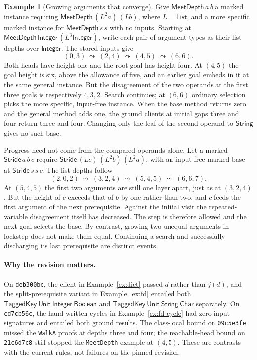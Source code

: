 \documentclass[11pt]{article}
\theoremstyle{definition}
\newtheorem{example}[theorem]{Example}
\newcommand{\code}[1]{\texttt{#1}}
\newcommand{\Bool}{\mathsf{Boolean}}
\newcommand{\Int}{\mathsf{Integer}}
\newcommand{\Str}{\mathsf{String}}
\newcommand{\Unit}{\mathsf{Unit}}
\newcommand{\List}{\mathsf{List}}
\begin{document}
\begin{example}[Growing arguments that converge]\label{ex:fd-height}
Give $\mathsf{MeetDepth}\,a\,b$ a marked instance requiring
$\mathsf{MeetDepth}\,(L^2a)\,(L b)$, where $L=\List$, and a more specific
marked instance for $\mathsf{MeetDepth}\,s\,s$ with no inputs. Starting
at $\mathsf{MeetDepth}\,\Int\,(L^3\Int)$, write each pair of argument
types as their list depths over $\Int$. The stored inputs give
\[
 (0,3)\;\leadsto\;(2,4)\;\leadsto\;(4,5)\;\leadsto\;(6,6).
\]
Both heads have height one and the root goal has height four. At $(4,5)$
the goal height is six, above the allowance of five, and an earlier goal
embeds in it at the same general instance. But the disagreement of the two operands
at the first three goals is respectively $4,3,2$. Search continues; at
$(6,6)$ ordinary selection picks the more specific, input-free instance.
When the base method returns zero and the general method adds one, the
ground clients at initial gaps three and four return three and four.
Changing only the leaf of the second operand to $\Str$ gives no such base.

Progress need not come from the compared operands alone. Let a marked
$\mathsf{Stride}\,a\,b\,c$ require $\mathsf{Stride}\,(Lc)\,(L^2b)\,(L^2a)$,
with an input-free marked base at $\mathsf{Stride}\,s\,s\,c$. The list depths follow
\[
 (2,0,2)\;\leadsto\;(3,2,4)\;\leadsto\;(5,4,5)\;\leadsto\;(6,6,7).
\]
At $(5,4,5)$ the first two arguments are still one layer apart, just as
at $(3,2,4)$. But the height of $c$ exceeds that of $b$ by one rather
than two, and $c$ feeds the first argument of the next prerequisite.
Against the initial visit the repeated-variable disagreement itself has
decreased. The step is therefore allowed and the next goal selects the
base. By contrast, growing two unequal arguments in lockstep does not
make them equal. Continuing a search and successfully discharging its
last prerequisite are distinct events.
\end{example}

\paragraph{Why the revision matters.}
On \code{deb300be}, the client in Example~\ref{ex:dict} passed $d$ rather
than $j(d)$, and the split-prerequisite variant in Example~\ref{ex:fd}
entailed both $\mathsf{TaggedKey}\ \Unit\ \Int\ \Bool$ and
$\mathsf{TaggedKey}\ \Unit\ \Str\ \mathsf{Char}$ separately. On
\code{cd7cb56c}, the hand-written cycles in Example~\ref{ex:fd-cycle}
had zero-input signatures and entailed both ground results. The
class-local bound on \code{09c5e3fe} missed the \code{WalkA} proofs at
depths three and four; the reachable-head bound on \code{21c6d7c8}
still stopped the \code{MeetDepth} example at $(4,5)$. These are
contrasts with the current rules, not failures on the pinned revision.
\end{document}
